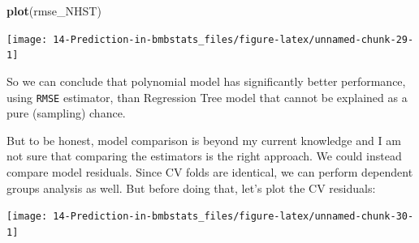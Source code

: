 \documentclass[
]{book}
\newenvironment{Shaded}{\begin{snugshade}}{\end{snugshade}}
\newcommand{\DataTypeTok}[1]{\textcolor[rgb]{0.13,0.29,0.53}{#1}}
\newcommand{\KeywordTok}[1]{\textcolor[rgb]{0.13,0.29,0.53}{\textbf{#1}}}
\newcommand{\NormalTok}[1]{#1}
\newcommand{\OperatorTok}[1]{\textcolor[rgb]{0.81,0.36,0.00}{\textbf{#1}}}
\newcommand{\StringTok}[1]{\textcolor[rgb]{0.31,0.60,0.02}{#1}}
\begin{document}
\begin{Shaded}
\begin{Highlighting}[]
\KeywordTok{plot}\NormalTok{(rmse\_NHST)}
\end{Highlighting}
\end{Shaded}

\begin{center}\texttt{[image: 14-Prediction-in-bmbstats\_files/figure-latex/unnamed-chunk-29-1]} \end{center}

So we can conclude that polynomial model has significantly better performance, using \texttt{RMSE} estimator, than Regression Tree model that cannot be explained as a pure (sampling) chance.

But to be honest, model comparison is beyond my current knowledge and I am not sure that comparing the estimators is the right approach. We could instead compare model residuals. Since CV folds are identical, we can perform dependent groups analysis as well. But before doing that, let's plot the CV residuals:

\begin{Shaded}
\end{Shaded}

\begin{center}\texttt{[image: 14-Prediction-in-bmbstats\_files/figure-latex/unnamed-chunk-30-1]} \end{center}
\end{document}
